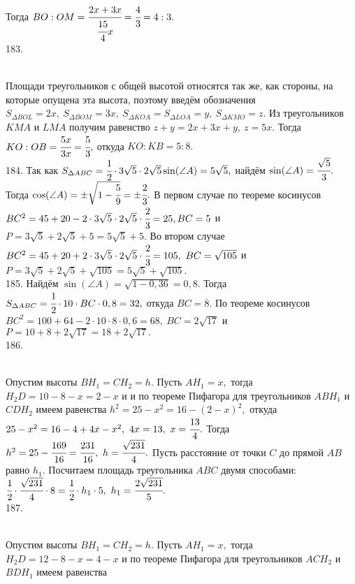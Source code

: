 Тогда $BO:OM=\cfrac{2x+3x}{\cfrac{15}{4}x}=\cfrac{4}{3}=4:3.$\\
183. \begin{figure}[ht!]
\end{figure}\\
Площади треугольников с общей высотой относятся так же, как стороны, на которые опущена эта высота, поэтому введём обозначения $S_{\Delta BOL}=2x,\ S_{\Delta BOM}=3x,\ S_{\Delta KOA}=S_{\Delta LOA}=y,\ S_{\Delta KMO}=z.$ Из треугольников $KMA$ и $LMA$ получим равенство $z+y=2x+3x+y,\ z=5x.$ Тогда $KO:OB=\cfrac{5x}{3x}=\cfrac{5}{3},$ откуда $KO:KB=5:8.$\\
184. Так как $S_{\Delta ABC}=\cfrac{1}{2}\cdot3\sqrt{5}\cdot2\sqrt{5}\sin(\angle A)=5\sqrt{5},$ найдём $\sin(\angle A)=\cfrac{\sqrt{5}}{3}.$ Тогда $\cos(\angle A)=\pm\sqrt{1-\cfrac{5}{9}}=\pm\cfrac{2}{3}.$ В первом случае по теореме косинусов $BC^2=45+20-2\cdot3\sqrt{5}\cdot2\sqrt{5}\cdot\cfrac{2}{3}=25, BC=5$ и
$P=3\sqrt{5}+2\sqrt{5}+5=5\sqrt{5}+5.$ Во втором случае $BC^2=45+20+2\cdot3\sqrt{5}\cdot2\sqrt{5}\cdot\cfrac{2}{3}=105,\ BC=\sqrt{105}$ и $P=3\sqrt{5}+2\sqrt{5}+\sqrt{105}=5\sqrt{5}+\sqrt{105}.$\\
185. Найдём $\sin(\angle A)=\sqrt{1-0,36}=0,8.$ Тогда $S_{\Delta ABC}=\cfrac{1}{2}\cdot10\cdot BC\cdot0,8=32,$ откуда $BC=8.$ По теореме косинусов $BC^2=100+64-2\cdot10\cdot8\cdot0,6=68,\ BC=2\sqrt{17}$ и $P=10+8+2\sqrt{17}=18+2\sqrt{17}.$\\
186. \begin{figure}[ht!]
\end{figure}\\
Опустим высоты $BH_1=CH_2=h.$ Пусть $AH_1=x,$ тогда $H_2D=10-8-x=2-x$ и и по теореме Пифагора для треугольников $ABH_1$ и $CDH_2$ имеем равенства $h^2=25-x^2=16-(2-x)^2,$ откуда $25-x^2=16-4+4x-x^2,\ 4x=13,\ x=\cfrac{13}{4}.$ Тогда $h^2=25-\cfrac{169}{16}=\cfrac{231}{16},\ h=\cfrac{\sqrt{231}}{4}.$ Пусть расстояние от точки $C$ до прямой $AB$ равно $h_1.$ Посчитаем площадь треугольника $ABC$ двумя способами: $\cfrac{1}{2}\cdot\cfrac{\sqrt{231}}{4}\cdot8=
\cfrac{1}{2}\cdot h_1\cdot5,\ h_1=\cfrac{2\sqrt{231}}{5}.$\\
187. \begin{figure}[ht!]
\end{figure}\\
Опустим высоты $BH_1=CH_2=h.$ Пусть $AH_1=x,$ тогда $H_2D=12-8-x=4-x$ и по теореме Пифагора для треугольников $ACH_2$ и $BDH_1$ имеем равенства
